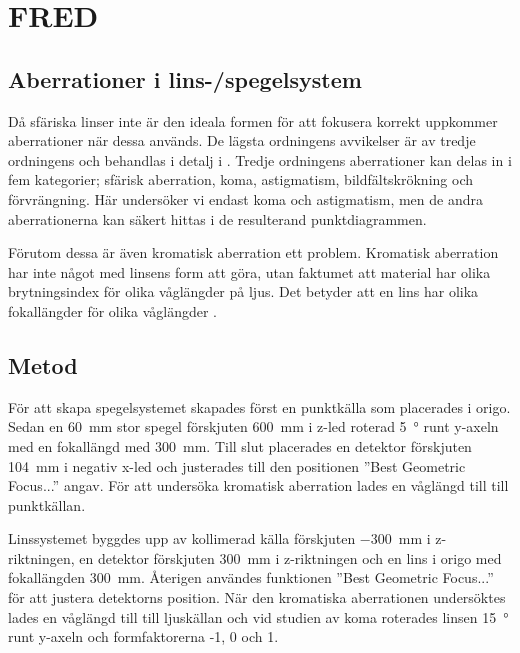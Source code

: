 \documentclass[a4paper]{article}
\begin{document}
\section{FRED}


\subsection{Aberrationer i lins-/spegelsystem}

Då sfäriska linser inte är den ideala formen för att fokusera korrekt uppkommer aberrationer när dessa används. De lägsta ordningens avvikelser är av tredje ordningens och behandlas i detalj i \cite[Kapitel~20]{pearsonIntroOpt}. Tredje ordningens aberrationer kan delas in i fem kategorier; sfärisk aberration, koma, astigmatism, bildfältskrökning och förvrängning. Här undersöker vi endast koma och astigmatism, men de andra aberrationerna kan säkert hittas i de resulterand punktdiagrammen.

Förutom dessa är även kromatisk aberration ett problem. Kromatisk aberration har inte något med linsens form att göra, utan faktumet att material har olika brytningsindex för olika våglängder på ljus. Det betyder att en lins har olika fokallängder för olika våglängder \cite[Kapitel~20]{pearsonIntroOpt}.

\subsection{Metod}

För att skapa spegelsystemet skapades först en punktkälla som placerades i origo. Sedan en \SI{60}{\milli\meter} stor spegel förskjuten \SI{600}{\milli\meter} i z-led roterad \SI{5}{\degree} runt y-axeln med en fokallängd med \SI{300}{\milli\meter}. Till slut placerades en detektor förskjuten \SI{104}{\milli\meter} i negativ x-led och justerades till den positionen ”Best Geometric Focus...” angav. För att undersöka kromatisk aberration lades en våglängd till till punktkällan.

Linssystemet byggdes upp av kollimerad källa förskjuten \SI{-300}{\milli\meter} i z-riktningen, en detektor förskjuten \SI{300}{\milli\meter} i z-riktningen och en lins i origo med fokallängden \SI{300}{\milli\meter}. Återigen användes funktionen ”Best Geometric Focus...” för att justera detektorns position. När den kromatiska aberrationen undersöktes lades en våglängd till till ljuskällan och vid studien av koma roterades linsen \SI{15}{\degree} runt y-axeln och formfaktorerna -1, 0 och 1.
\end{document}
